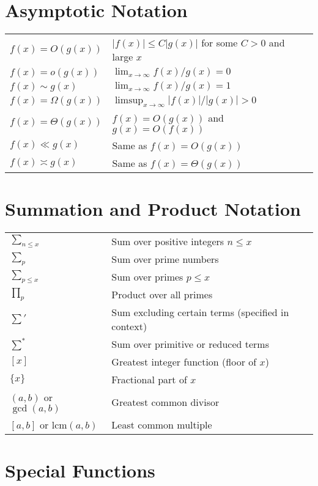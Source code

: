 \section{Asymptotic Notation}

\begin{tabular}{ll}
$f(x) = O(g(x))$ & $|f(x)| \leq C|g(x)|$ for some $C > 0$ and large $x$ \\
$f(x) = o(g(x))$ & $\lim_{x \to \infty} f(x)/g(x) = 0$ \\
$f(x) \sim g(x)$ & $\lim_{x \to \infty} f(x)/g(x) = 1$ \\
$f(x) = \Omega(g(x))$ & $\limsup_{x \to \infty} |f(x)|/|g(x)| > 0$ \\
$f(x) = \Theta(g(x))$ & $f(x) = O(g(x))$ and $g(x) = O(f(x))$ \\
$f(x) \ll g(x)$ & Same as $f(x) = O(g(x))$ \\
$f(x) \asymp g(x)$ & Same as $f(x) = \Theta(g(x))$ \\
\end{tabular}

\section{Summation and Product Notation}

\begin{tabular}{ll}
$\sum_{n \leq x}$ & Sum over positive integers $n \leq x$ \\
$\sum_{p}$ & Sum over prime numbers \\
$\sum_{p \leq x}$ & Sum over primes $p \leq x$ \\
$\prod_{p}$ & Product over all primes \\
$\sum'$ & Sum excluding certain terms (specified in context) \\
$\sum^*$ & Sum over primitive or reduced terms \\
$[x]$ & Greatest integer function (floor of $x$) \\
$\{x\}$ & Fractional part of $x$ \\
$(a,b)$ or $\gcd(a,b)$ & Greatest common divisor \\
$[a,b]$ or $\text{lcm}(a,b)$ & Least common multiple \\
\end{tabular}

\section{Special Functions}

